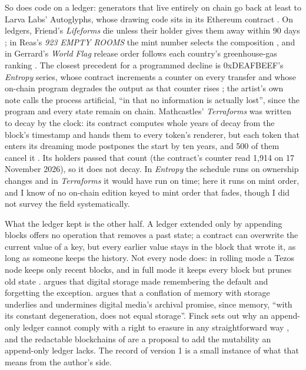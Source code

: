\documentclass[11pt]{article}
\begin{document}
So does code on a ledger: generators that live entirely on chain go back at least to Larva Labs' Autoglyphs, whose drawing code sits in its Ethereum contract \citep{larvalabs2019}. On ledgers, Friend's \emph{Lifeforms} die unless their holder gives them away within 90 days \citep{friend2021}; in Reas's \emph{923 EMPTY ROOMS} the mint number selects the composition \citep{reas2023}, and in Gerrard's \emph{World Flag} release order follows each country's greenhouse-gas ranking \citep{gerrard2023}. The closest precedent for a programmed decline is 0xDEAFBEEF's \emph{Entropy} series, whose contract increments a counter on every transfer and whose on-chain program degrades the output as that counter rises \citep{deafbeef2021}; the artist's own note calls the process artificial, ``in that no information is actually lost'', since the program and every state remain on chain. Mathcastles' \emph{Terraforms} was written to decay by the clock: its contract computes whole years of decay from the block's timestamp and hands them to every token's renderer, but each token that enters its dreaming mode postpones the start by ten years, and 500 of them cancel it \citep{mathcastles2021}. Its holders passed that count (the contract's counter read 1,914 on 17 November 2026), so it does not decay. In \emph{Entropy} the schedule runs on ownership changes and in \emph{Terraforms} it would have run on time; here it runs on mint order, and I know of no on-chain edition keyed to mint order that fades, though I did not survey the field systematically.

What the ledger kept is the other half. A ledger extended only by appending blocks \citep{nakamoto2008,wood2014,goodman2014} offers no operation that removes a past state; a contract can overwrite the current value of a key, but every earlier value stays in the block that wrote it, as long as someone keeps the history. Not every node does: in rolling mode a Tezos node keeps only recent blocks, and in full mode it keeps every block but prunes old state \citep{octezhistory}. \citet{mayerschonberger2009} argues that digital storage made remembering the default and forgetting the exception. \citet{chun2008} argues that a conflation of memory with storage underlies and undermines digital media's archival promise, since memory, ``with its constant degeneration, does not equal storage''. Finck sets out why an append-only ledger cannot comply with a right to erasure in any straightforward way \citep{finck2018}, and the redactable blockchains of \citet{ateniese2017} are a proposal to add the mutability an append-only ledger lacks. The record of version 1 is a small instance of what that means from the author's side.
\end{document}
